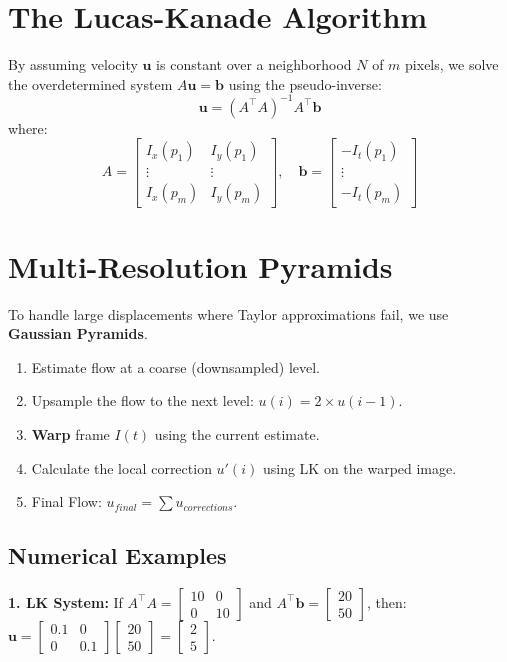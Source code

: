 \documentclass{report}
\begin{document}
\section{The Lucas-Kanade Algorithm}
By assuming velocity $\mathbf{u}$ is constant over a neighborhood $N$ of $m$ pixels, we solve the overdetermined system $A\mathbf{u} = \mathbf{b}$ using the pseudo-inverse:
\begin{equation}
    \mathbf{u} = (A^\top A)^{-1} A^\top \mathbf{b}
\end{equation}
where:
\begin{equation}
    A = \begin{bmatrix} I_x(p_1) & I_y(p_1) \\ \vdots & \vdots \\ I_x(p_m) & I_y(p_m) \end{bmatrix}, \quad \mathbf{b} = \begin{bmatrix} -I_t(p_1) \\ \vdots \\ -I_t(p_m) \end{bmatrix}
\end{equation}

\section{Multi-Resolution Pyramids}
To handle large displacements where Taylor approximations fail, we use \textbf{Gaussian Pyramids}.
\begin{enumerate}
    \item Estimate flow at a coarse (downsampled) level.
    \item Upsample the flow to the next level: $u(i) = 2 \times u(i-1)$.
    \item \textbf{Warp} frame $I(t)$ using the current estimate.
    \item Calculate the local correction $u'(i)$ using LK on the warped image.
    \item Final Flow: $u_{final} = \sum u_{corrections}$.
\end{enumerate}

\subsection{Numerical Examples}
\textbf{1. LK System:} If $A^\top A = \begin{bmatrix} 10 & 0 \\ 0 & 10 \end{bmatrix}$ and $A^\top \mathbf{b} = \begin{bmatrix} 20 \\ 50 \end{bmatrix}$, then:
$\mathbf{u} = \begin{bmatrix} 0.1 & 0 \\ 0 & 0.1 \end{bmatrix} \begin{bmatrix} 20 \\ 50 \end{bmatrix} = \begin{bmatrix} 2 \\ 5 \end{bmatrix}$.
\end{document}
